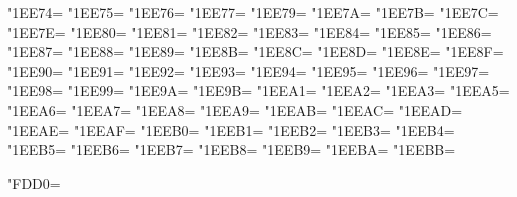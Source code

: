 \XeTeXcharclass"1EE74=\KclassArabU
\XeTeXcharclass"1EE75=\KclassArabU
\XeTeXcharclass"1EE76=\KclassArabU
\XeTeXcharclass"1EE77=\KclassArabU
\XeTeXcharclass"1EE79=\KclassArabU
\XeTeXcharclass"1EE7A=\KclassArabU
\XeTeXcharclass"1EE7B=\KclassArabU
\XeTeXcharclass"1EE7C=\KclassArabU
\XeTeXcharclass"1EE7E=\KclassArabU
\XeTeXcharclass"1EE80=\KclassArabU
\XeTeXcharclass"1EE81=\KclassArabU
\XeTeXcharclass"1EE82=\KclassArabU
\XeTeXcharclass"1EE83=\KclassArabU
\XeTeXcharclass"1EE84=\KclassArabU
\XeTeXcharclass"1EE85=\KclassArabU
\XeTeXcharclass"1EE86=\KclassArabU
\XeTeXcharclass"1EE87=\KclassArabU
\XeTeXcharclass"1EE88=\KclassArabU
\XeTeXcharclass"1EE89=\KclassArabU
\XeTeXcharclass"1EE8B=\KclassArabU
\XeTeXcharclass"1EE8C=\KclassArabU
\XeTeXcharclass"1EE8D=\KclassArabU
\XeTeXcharclass"1EE8E=\KclassArabU
\XeTeXcharclass"1EE8F=\KclassArabU
\XeTeXcharclass"1EE90=\KclassArabU
\XeTeXcharclass"1EE91=\KclassArabU
\XeTeXcharclass"1EE92=\KclassArabU
\XeTeXcharclass"1EE93=\KclassArabU
\XeTeXcharclass"1EE94=\KclassArabU
\XeTeXcharclass"1EE95=\KclassArabU
\XeTeXcharclass"1EE96=\KclassArabU
\XeTeXcharclass"1EE97=\KclassArabU
\XeTeXcharclass"1EE98=\KclassArabU
\XeTeXcharclass"1EE99=\KclassArabU
\XeTeXcharclass"1EE9A=\KclassArabU
\XeTeXcharclass"1EE9B=\KclassArabU
\XeTeXcharclass"1EEA1=\KclassArabU
\XeTeXcharclass"1EEA2=\KclassArabU
\XeTeXcharclass"1EEA3=\KclassArabU
\XeTeXcharclass"1EEA5=\KclassArabU
\XeTeXcharclass"1EEA6=\KclassArabU
\XeTeXcharclass"1EEA7=\KclassArabU
\XeTeXcharclass"1EEA8=\KclassArabU
\XeTeXcharclass"1EEA9=\KclassArabU
\XeTeXcharclass"1EEAB=\KclassArabU
\XeTeXcharclass"1EEAC=\KclassArabU
\XeTeXcharclass"1EEAD=\KclassArabU
\XeTeXcharclass"1EEAE=\KclassArabU
\XeTeXcharclass"1EEAF=\KclassArabU
\XeTeXcharclass"1EEB0=\KclassArabU
\XeTeXcharclass"1EEB1=\KclassArabU
\XeTeXcharclass"1EEB2=\KclassArabU
\XeTeXcharclass"1EEB3=\KclassArabU
\XeTeXcharclass"1EEB4=\KclassArabU
\XeTeXcharclass"1EEB5=\KclassArabU
\XeTeXcharclass"1EEB6=\KclassArabU
\XeTeXcharclass"1EEB7=\KclassArabU
\XeTeXcharclass"1EEB8=\KclassArabU
\XeTeXcharclass"1EEB9=\KclassArabU
\XeTeXcharclass"1EEBA=\KclassArabU
\XeTeXcharclass"1EEBB=\KclassArabU

\XeTeXcharclass"FDD0=\KclassIgnore

